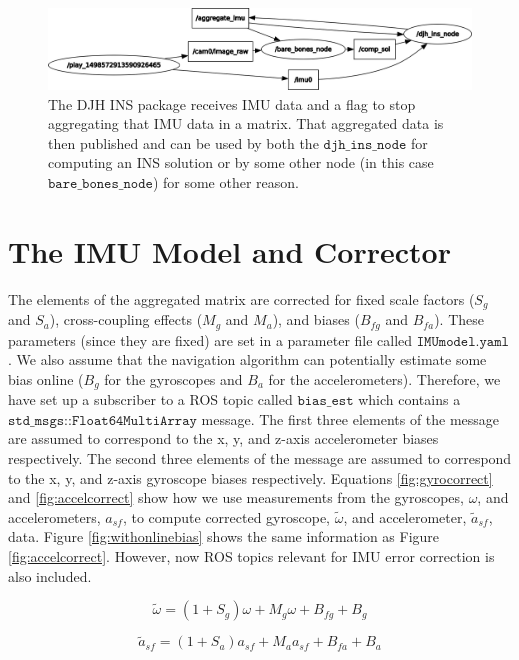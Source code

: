 \documentclass[11pt,a4paper]{article}
\begin{document}
\begin{figure}
	\centering
	\includegraphics[scale=0.425]{djhinsagg}
	\caption{The DJH INS package receives IMU data and a flag to stop aggregating that IMU data in a matrix. That aggregated data is then published and can be used by both the $\texttt{djh\_ins\_node}$ for computing an INS solution or by some other node (in this case $\texttt{bare\_bones\_node}$) for some other reason.}
	\label{fig:djhinsagg}
\end{figure}

\section{The IMU Model and Corrector}

The elements of the aggregated matrix are corrected for fixed scale factors ($S_g$ and $S_a$), cross-coupling effects ($M_g$ and $M_a$), and biases ($B_{fg}$ and $B_{fa}$). These parameters (since they are fixed) are set in a parameter file called $\texttt{IMUmodel.yaml}$. We also assume that the navigation algorithm can potentially estimate some bias online ($B_g$ for the gyroscopes and $B_a$ for the accelerometers). Therefore, we have set up a subscriber to a ROS topic called $\texttt{bias\_est}$ which contains a $\texttt{std\_msgs::Float64MultiArray}$ message. The first three elements of the message are assumed to correspond to the x, y, and z-axis accelerometer biases respectively. The second three elements of the message are assumed to correspond to the x, y, and z-axis gyroscope biases respectively. Equations \ref{fig:gyrocorrect} and \ref{fig:accelcorrect} show how we use measurements from the gyroscopes, $\omega$, and accelerometers, $a_{sf}$, to compute corrected gyroscope, $\tilde{\omega}$, and accelerometer, $\tilde{a}_{sf}$, data. Figure \ref{fig:withonlinebias} shows the same information as Figure \ref{fig:accelcorrect}. However, now ROS topics relevant for IMU error correction is also included.

\begin{equation}
	\tilde{\omega} = (1 + S_g)\omega + M_g \omega + B_{fg} + B_g
	\label{fig:gyrocorrect}
\end{equation}

\begin{equation}
	\tilde{a}_{sf} = (1 + S_a)a_{sf} + M_a a_{sf} + B_{fa} + B_a
	\label{fig:accelcorrect}
\end{equation}
\end{document}
